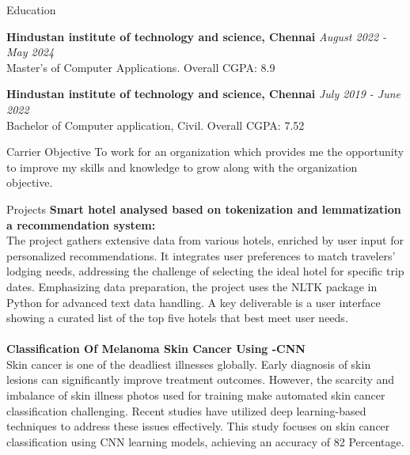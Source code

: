 \documentclass{resume} %
\begin{document}

\begin{rSection}{Education}

{\bf Hindustan institute of technology and science, Chennai} \hfill {\em August 2022 - May 2024} 
\\ Master's of Computer Applications.\hfill { Overall CGPA: 8.9 }

{\bf Hindustan institute of technology and science, Chennai} \hfill {\em July 2019 - June 2022} 
\\ Bachelor of Computer application, Civil.\hfill { Overall CGPA: 7.52 }


\end{rSection}

\begin{rSection}{Carrier Objective}
 To work for an organization which provides me the opportunity to improve my skills and knowledge to grow along with the organization objective.
\end{rSection}
\begin{rSection}{Projects}
{\bf Smart hotel analysed based on tokenization
and lemmatization a recommendation system:}
\\The project gathers extensive data from various hotels, enriched by user input for personalized recommendations. It integrates user preferences to match travelers' lodging needs, addressing the challenge of selecting the ideal hotel for specific trip dates. Emphasizing data preparation, the project uses the NLTK package in Python for advanced text data handling. A key deliverable is a user interface showing a curated list of the top five hotels that best meet user needs. \\
\\{\bf Classification Of Melanoma Skin
Cancer Using -CNN}\\
Skin cancer is one of the deadliest illnesses globally. Early diagnosis of skin lesions can significantly improve treatment outcomes. However, the scarcity and imbalance of skin illness photos used for training make automated skin cancer classification challenging. Recent studies have utilized deep learning-based techniques to address these issues effectively. This study focuses on skin cancer classification using CNN learning models, achieving an accuracy of 82 Percentage.\\

\end{rSection}
\end{document}
